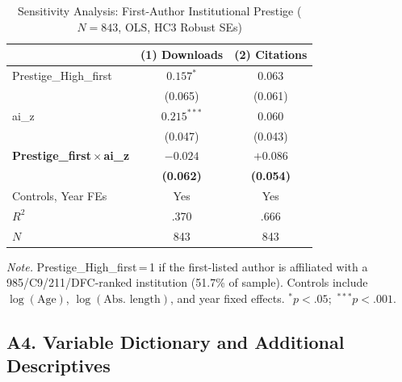 \documentclass[12pt,a4paper]{article}
\begin{document}
\begin{table}[htbp]
\centering
\caption{Sensitivity Analysis: First-Author Institutional Prestige
         ($N = 843$, OLS, HC3 Robust SEs)}
\label{tab:firstauthor}
\begin{threeparttable}
\small
\begin{tabular}{lcc}
\toprule
 & (1) Downloads & (2) Citations \\
\midrule
Prestige\_High\_first
  & $0.157^{*}$ & $0.063$ \\
  & (0.065)     & (0.061) \\[4pt]
ai\_z
  & $0.215^{***}$ & $0.060$ \\
  & (0.047)       & (0.043) \\[4pt]
\textbf{Prestige\_first\,$\times$\,ai\_z}
  & $\mathbf{-0.024}$ & $\mathbf{+0.086}$ \\
  & \textbf{(0.062)}  & \textbf{(0.054)}  \\[4pt]
\midrule
Controls, Year FEs & Yes & Yes \\
$R^2$              & .370 & .666 \\
$N$                & 843  & 843  \\
\bottomrule
\end{tabular}
\begin{tablenotes}
\footnotesize
\item \textit{Note.} Prestige\_High\_first\,=\,1 if the first-listed author is
  affiliated with a 985/C9/211/DFC-ranked institution (51.7\% of sample).
  Controls include $\log(\text{Age})$, $\log(\text{Abs.\ length})$,
  and year fixed effects.
  $^{*}p<.05$;\ $^{***}p<.001$.
\end{tablenotes}
\end{threeparttable}
\end{table}

\subsection*{A4. Variable Dictionary and Additional Descriptives}
\end{document}

